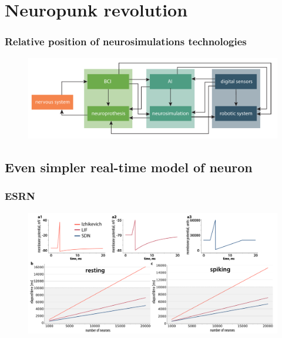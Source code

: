 \documentclass[12pt, aspectratio=169]{beamer}
\begin{document}
\section{Neuropunk revolution}
\begin{frame}
  \frametitle{Relative position of neurosimulations technologies}
  \begin{figure}
    \includegraphics[width=1.0\linewidth]{neuropunk}
  \end{figure}
\end{frame}
\subsection{Even simpler real-time model of neuron}
\begin{frame}
  \frametitle{ESRN}
  \begin{figure}
    \includegraphics[width=0.8\linewidth]{states}
  \end{figure}
\end{frame}
\end{document}
